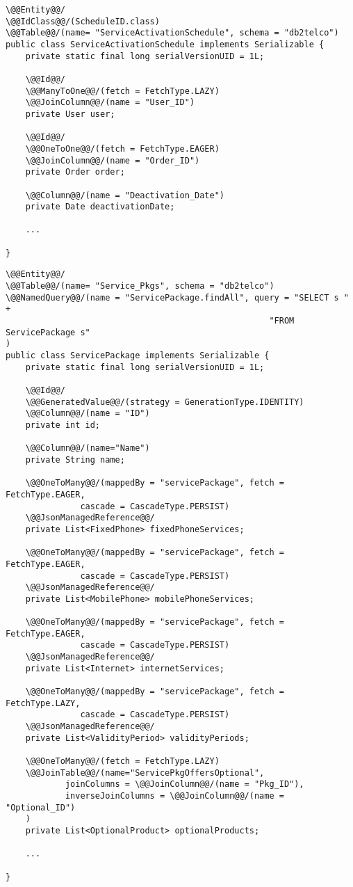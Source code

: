 \begin{lstlisting}[style = JPA]
\@@Entity@@/
\@@IdClass@@/(ScheduleID.class)
\@@Table@@/(name= "ServiceActivationSchedule", schema = "db2telco")
public class ServiceActivationSchedule implements Serializable {
    private static final long serialVersionUID = 1L;

    \@@Id@@/
    \@@ManyToOne@@/(fetch = FetchType.LAZY)
    \@@JoinColumn@@/(name = "User_ID")
    private User user;

    \@@Id@@/
    \@@OneToOne@@/(fetch = FetchType.EAGER)
    \@@JoinColumn@@/(name = "Order_ID")
    private Order order;

    \@@Column@@/(name = "Deactivation_Date")
    private Date deactivationDate;
    
    ...

}
\end{lstlisting}

\begin{lstlisting}[style = JPA]
\@@Entity@@/
\@@Table@@/(name= "Service_Pkgs", schema = "db2telco")
\@@NamedQuery@@/(name = "ServicePackage.findAll", query = "SELECT s " +
                                                     "FROM ServicePackage s"
)
public class ServicePackage implements Serializable {
    private static final long serialVersionUID = 1L;

    \@@Id@@/
    \@@GeneratedValue@@/(strategy = GenerationType.IDENTITY)
    \@@Column@@/(name = "ID")
    private int id;

    \@@Column@@/(name="Name")
    private String name;

    \@@OneToMany@@/(mappedBy = "servicePackage", fetch = FetchType.EAGER, 
               cascade = CascadeType.PERSIST)
    \@@JsonManagedReference@@/
    private List<FixedPhone> fixedPhoneServices;

    \@@OneToMany@@/(mappedBy = "servicePackage", fetch = FetchType.EAGER, 
               cascade = CascadeType.PERSIST)
    \@@JsonManagedReference@@/
    private List<MobilePhone> mobilePhoneServices;

    \@@OneToMany@@/(mappedBy = "servicePackage", fetch = FetchType.EAGER,
               cascade = CascadeType.PERSIST)
    \@@JsonManagedReference@@/
    private List<Internet> internetServices;

    \@@OneToMany@@/(mappedBy = "servicePackage", fetch = FetchType.LAZY,
               cascade = CascadeType.PERSIST)
    \@@JsonManagedReference@@/
    private List<ValidityPeriod> validityPeriods;

    \@@OneToMany@@/(fetch = FetchType.LAZY)
    \@@JoinTable@@/(name="ServicePkgOffersOptional",
            joinColumns = \@@JoinColumn@@/(name = "Pkg_ID"),
            inverseJoinColumns = \@@JoinColumn@@/(name = "Optional_ID")
    )
    private List<OptionalProduct> optionalProducts;
    
    ...

}
\end{lstlisting}


